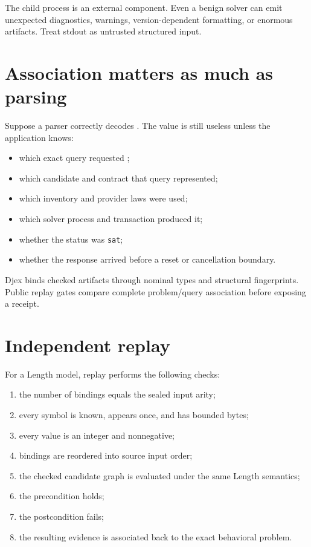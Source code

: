 \documentclass[10pt,letterpaper,oneside]{report}
\newcommand{\code}[1]{\texttt{\detokenize{#1}}}
\newcommand{\sat}{\texttt{sat}}
\begin{document}
The child process is an external component. Even a benign solver can emit unexpected diagnostics, warnings, version-dependent formatting, or enormous artifacts. Treat stdout as untrusted structured input.

\section{Association matters as much as parsing}

Suppose a parser correctly decodes \code{((in0 3))}. The value is still useless unless the application knows:

\begin{itemize}
\item which exact query requested \code{in0};
\item which candidate and contract that query represented;
\item which inventory and provider laws were used;
\item which solver process and transaction produced it;
\item whether the status was \sat;
\item whether the response arrived before a reset or cancellation boundary.
\end{itemize}

Djex binds checked artifacts through nominal types and structural fingerprints. Public replay gates compare complete problem/query association before exposing a receipt.

\section{Independent replay}

For a Length model, replay performs the following checks:

\begin{enumerate}
\item the number of bindings equals the sealed input arity;
\item every symbol is known, appears once, and has bounded bytes;
\item every value is an integer and nonnegative;
\item bindings are reordered into source input order;
\item the checked candidate graph is evaluated under the same Length semantics;
\item the precondition holds;
\item the postcondition fails;
\item the resulting evidence is associated back to the exact behavioral problem.
\end{enumerate}
\end{document}
